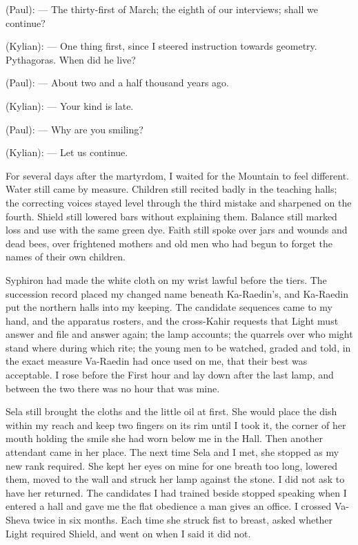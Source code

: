 
\begin{room}

(Paul): --- The thirty-first of March; the eighth of our interviews; shall we continue?

(Kylian): --- One thing first, since I steered instruction towards geometry. Pythagoras. When did he live?

(Paul): --- About two and a half thousand years ago.

(Kylian): --- Your kind is late.

(Paul): --- Why are you smiling?

(Kylian): --- Let us continue.

\end{room}


For several days after the martyrdom, I waited for the Mountain to feel different. Water still came by measure. Children still recited badly in the teaching halls; the correcting voices stayed level through the third mistake and sharpened on the fourth. Shield still lowered bars without explaining them. Balance still marked loss and use with the same green dye. Faith still spoke over jars and wounds and dead bees, over frightened mothers and old men who had begun to forget the names of their own children. \par

Syphiron had made the white cloth on my wrist lawful before the tiers. The succession record placed my changed name beneath Ka-Raedin's, and Ka-Raedin put the northern halls into my keeping. The candidate sequences came to my hand, and the apparatus rosters, and the cross-Kahir requests that Light must answer and file and answer again; the lamp accounts; the quarrels over who might stand where during which rite; the young men to be watched, graded and told, in the exact measure Va-Raedin had once used on me, that their best was acceptable. I rose before the First hour and lay down after the last lamp, and between the two there was no hour that was mine.\par

Sela still brought the cloths and the little oil at first. She would place the dish within my reach and keep two fingers on its rim until I took it, the corner of her mouth holding the smile she had worn below me in the Hall. Then another attendant came in her place. The next time Sela and I met, she stopped as my new rank required. She kept her eyes on mine for one breath too long, lowered them, moved to the wall and struck her lamp against the stone. I did not ask to have her returned. The candidates I had trained beside stopped speaking when I entered a hall and gave me the flat obedience a man gives an office. I crossed Va-Sheva twice in six months. Each time she struck fist to breast, asked whether Light required Shield, and went on when I said it did not.\par

